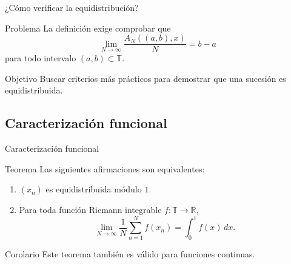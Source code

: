 \begin{frame}{¿Cómo verificar la equidistribución?}

\begin{alertblock}{Problema}
La definición exige comprobar que
\[
\lim_{N\to\infty}\frac{A_N((a,b),x)}{N}=b-a
\]
para todo intervalo $(a,b)\subset\mathbb T$.
\end{alertblock}

\vspace{0.3cm}
\pause

\begin{exampleblock}{Objetivo}
Buscar criterios más prácticos para demostrar
que una sucesión es equidistribuida.
\end{exampleblock}


\end{frame}


\subsection{Caracterización funcional}
\begin{frame}{Caracterización funcional}

\begin{block}{Teorema}
Las siguientes afirmaciones son equivalentes:
\begin{enumerate}
\item $(x_n)$ es equidistribuida módulo $1$.
\item Para toda función Riemann integrable $f:\mathbb T\to\mathbb R$,
\[
\lim_{N\to\infty}\frac{1}{N}\sum_{n=1}^{N}f(x_n)=\int_0^1 f(x)\,dx.
\]
\end{enumerate}
\end{block}

\vspace{0.2cm}
\pause

\begin{block}{Corolario}
Este teorema también es válido para funciones continuas.
\end{block}

\end{frame}


